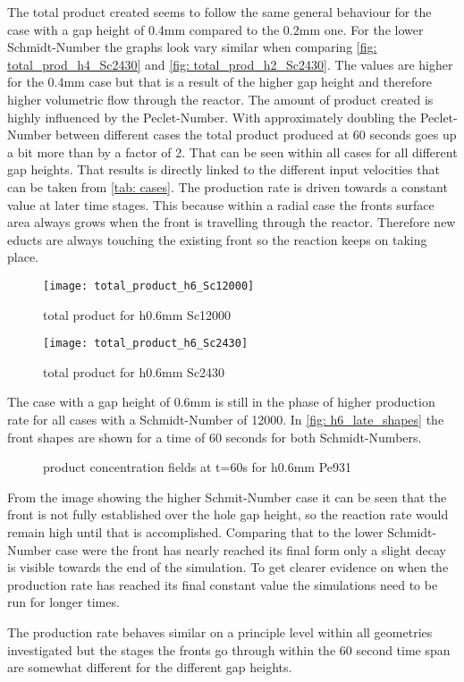 \documentclass[../thesis.tex]{subfiles}
\begin{document}
The total product created seems to follow the same general behaviour for the case with a gap height of 0.4mm compared to the 0.2mm one. For the lower Schmidt-Number the graphs look vary similar when comparing \autoref{fig: total_prod_h4_Sc2430} and \autoref{fig: total_prod_h2_Sc2430}. The values are higher for the 0.4mm case but that is a result of the higher gap height and therefore higher volumetric flow through the reactor. The amount of product created is highly influenced by the Peclet-Number. With approximately doubling the Peclet-Number between different cases the total product produced at 60 seconds goes up a bit more than by a factor of 2. That can be seen within all cases for all different gap heights. That results is directly linked to the different input velocities that can be taken from \autoref{tab: cases}. The production rate is driven towards a constant value at later time stages. This because within a radial case the fronts surface area always grows when the front is travelling through the reactor. Therefore new educts are always touching the existing front so the reaction keeps on taking place.
\begin{figure}[htbp]
	\centering
	\texttt{[image: total\_product\_h6\_Sc12000]}
	\caption{total product for h0.6mm Sc12000\label{fig: total_prod_h6_Sc12000}}\bigskip
	\texttt{[image: total\_product\_h6\_Sc2430]}
	\caption{total product for h0.6mm Sc2430\label{fig: total_prod_h6_Sc2430}}
\end{figure}

The case with a gap height of 0.6mm is still in the phase of higher production rate for all cases with a Schmidt-Number of 12000. In \autoref{fig: h6_late_shapes} the front shapes are shown for a time of 60 seconds for both Schmidt-Numbers.
\begin{figure}[htb]
	\centering
	\qquad
	\caption{product concentration fields at t=60s for h0.6mm Pe931}%
	\label{fig: h6_late_shapes}%
\end{figure}
From the image showing the higher Schmit-Number case it can be seen that the front is not fully established over the hole gap height, so the reaction rate would remain high until that is accomplished. Comparing that to the lower Schmidt-Number case were the front has nearly reached its final form only a slight decay is visible towards the end of the simulation. To get clearer evidence on when the production rate has reached its final constant value the simulations need to be run for longer times.

The production rate behaves similar on a principle level within all geometries investigated but the stages the fronts go through within the 60 second time span are somewhat different for the different gap heights.
\end{document}
